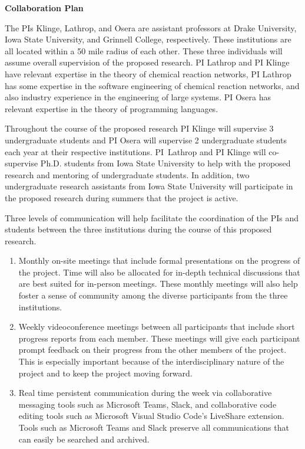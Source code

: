 \documentclass[11pt]{article}
\begin{document}
    \setcounter{page}{1}
    \begin{center}
        {\Large {\bf Collaboration Plan}}
    \end{center}

      The PIs Klinge, Lathrop, and Osera are assistant professors at Drake University, Iowa State University, and Grinnell College, respectively.
      These institutions are all located within a 50 mile radius of each other.
      These three individuals will assume overall supervision of the proposed research.
      PI Lathrop and PI Klinge have relevant expertise in the theory of chemical reaction networks, PI Lathrop has some expertise in the software engineering of chemical reaction networks, and also industry experience in the engineering of large systems.
      PI Osera has relevant expertise in the theory of programming languages.
    
      Throughout the course of the proposed research PI Klinge will supervise 3 undergraduate students and PI Osera will supervise 2 undergraduate students each year at their respective institutions.
      PI~Lathrop and PI Klinge will co-supervise Ph.D. students from Iowa State University to help with the proposed research and mentoring of undergraduate students.
      In addition, two undergraduate research assistants from Iowa State University will participate in the proposed research during summers that the project is active.
      
      Three levels of communication will help facilitate the coordination of the PIs and students between the three institutions during the course of this proposed research.
      \begin{enumerate}
        \item
        Monthly on-site meetings that include formal presentations on the progress of the project.
        Time will also be allocated for in-depth technical discussions that are best suited for in-person meetings.
        These monthly meetings will also help foster a sense of community among the diverse participants from the three institutions.

        \item
        Weekly videoconference meetings between all participants that include short progress reports from each member.
        These meetings will give each participant prompt feedback on their progress from the other members of the project.
        This is especially important because of the interdisciplinary nature of the project and to keep the project moving forward.

        \item
        Real time persistent communication during the week via collaborative messaging tools such as Microsoft Teams, Slack, and collaborative code editing tools such as Microsoft Visual Studio Code's LiveShare extension.
        Tools such as Microsoft Teams and Slack preserve all communications that can easily be searched and archived.
      \end{enumerate}
      
\end{document}
